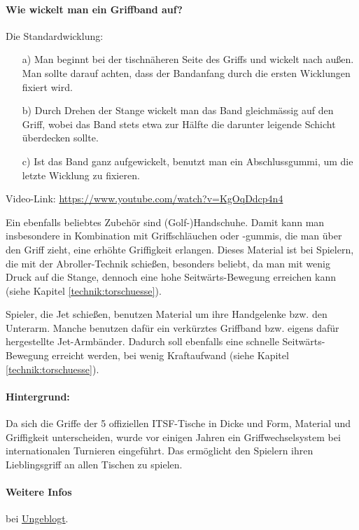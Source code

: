 \paragraph{Wie wickelt man ein Griffband auf?} Die Standardwicklung: 
\begin{itemize}
\item[a)] Man beginnt bei der tischnäheren Seite des Griffs und wickelt nach außen.
Man sollte darauf achten, dass der Bandanfang durch die ersten Wicklungen fixiert wird. 
\item[b)] Durch Drehen der Stange wickelt man das Band gleichmässig auf den Griff, wobei das Band stets etwa zur Hälfte die darunter leigende Schicht überdecken sollte.
\item[c)] Ist das Band ganz aufgewickelt, benutzt man ein Abschlussgummi, um die letzte Wicklung zu fixieren.
\end{itemize}
Video-Link: \url{https://www.youtube.com/watch?v=KgOqDdcp4n4}


Ein ebenfalls beliebtes Zubehör sind (Golf-)Handschuhe. 
Damit kann man insbesondere in Kombination mit Griffschläuchen oder -gummis, die man über den Griff zieht, eine erhöhte Griffigkeit erlangen.
Dieses Material ist bei Spielern, die mit der Abroller-Technik schießen, besonders beliebt, da man mit wenig Druck auf die Stange, dennoch eine hohe Seitwärts-Bewegung erreichen kann (siehe Kapitel \ref{technik:torschuesse}).  

Spieler, die Jet schießen, benutzen Material um ihre Handgelenke bzw. den Unterarm. 
Manche benutzen dafür ein verkürztes Griffband bzw. eigens dafür hergestellte Jet-Armbänder.
Dadurch soll ebenfalls eine schnelle Seitwärts-Bewegung erreicht werden, bei wenig Kraftaufwand (siehe Kapitel \ref{technik:torschuesse}).

\paragraph{Hintergrund:} Da sich die Griffe der 5 offiziellen ITSF-Tische in Dicke und Form, Material und Griffigkeit unterscheiden, wurde vor einigen Jahren ein Griffwechselsystem bei internationalen Turnieren eingeführt.
Das ermöglicht den Spielern ihren Lieblingsgriff an allen Tischen zu spielen. 

\paragraph{Weitere Infos} bei \href{http://ungeblogtkickern.blogspot.de/2015/05/griffe-praparieren.html}{Ungeblogt}.

